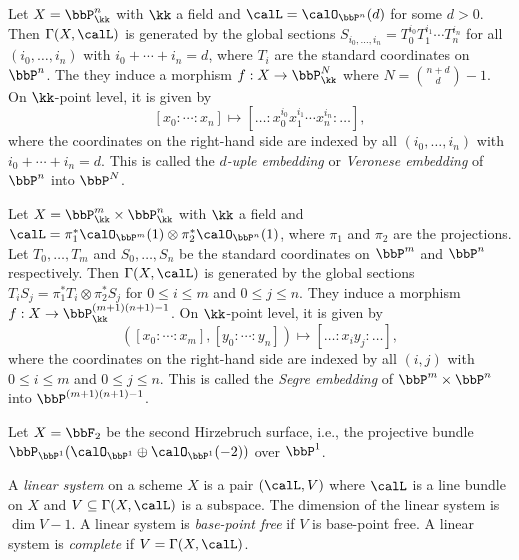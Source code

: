     \begin{example}\label{eg:d-uple_embedding_or_Veronese_embedding}
        Let \(X=\bbP^n_\kk\) with \(\kk\) a field and \(\calL=\calO_{\bbP^n}(d)\) for some \(d>0\).
        Then \(\Gamma(X,\calL)\) is generated by the global sections \(S_{i_0,\ldots,i_n}=T_0^{i_0}T_1^{i_1}\cdots T_n^{i_n}\) for all \((i_0,\ldots,i_n)\) with \(i_0+\cdots+i_n=d\), where \(T_i\) are the standard coordinates on \(\bbP^n\).
        The they induce a morphism \(f:X\to \bbP^N_\kk\) where \(N=\binom{n+d}{d}-1\).
        On \(\kk\)-point level, it is given by
        \[
            [x_0:\cdots:x_n] \mapsto [\ldots:x_0^{i_0}x_1^{i_1}\cdots x_n^{i_n}:\ldots],
        \]
        where the coordinates on the right-hand side are indexed by all \((i_0,\ldots,i_n)\) with \(i_0+\cdots+i_n=d\).
        This is called the \emph{\(d\)-uple embedding} or \emph{Veronese embedding} of \(\bbP^n\) into \(\bbP^N\).
    \end{example}

    \begin{example}\label{eg:Segre_embedding}
        Let \(X=\bbP^m_\kk \times \bbP^n_\kk\) with \(\kk\) a field and \(\calL=\pi_1^*\calO_{\bbP^m}(1) \otimes \pi_2^*\calO_{\bbP^n}(1)\), where \(\pi_1\) and \(\pi_2\) are the projections.
        Let \(T_0,\ldots,T_m\) and \(S_0,\ldots,S_n\) be the standard coordinates on \(\bbP^m\) and \(\bbP^n\) respectively.
        Then \(\Gamma(X,\calL)\) is generated by the global sections \(T_i S_j = \pi_1^*T_i \otimes \pi_2^*S_j\) for \(0\leq i \leq m\) and \(0\leq j \leq n\).
        They induce a morphism \(f:X\to \bbP^{(m+1)(n+1)-1}_\kk\).
        On \(\kk\)-point level, it is given by
        \[ ([x_0:\cdots:x_m],[y_0:\cdots:y_n]) \mapsto [\ldots:x_i y_j:\ldots], \]
        where the coordinates on the right-hand side are indexed by all \((i,j)\) with \(0\leq i \leq m\) and \(0\leq j \leq n\).
        This is called the \emph{Segre embedding} of \(\bbP^m \times \bbP^n\) into \(\bbP^{(m+1)(n+1)-1}\).
    \end{example}

    \begin{example}\label{eg:morphism_induced_by_-K_of_Hirzebruch_surface_F_2}
        Let \(X=\bbF_2\) be the second Hirzebruch surface, i.e., the projective bundle \(\bbP_{\bbP^1}(\calO_{\bbP^1}\oplus \calO_{\bbP^1}(-2))\) over \(\bbP^1\).
    \end{example}

    \begin{definition}\label{def:general_linear_system}
        A \emph{linear system} on a scheme \(X\) is a pair \((\calL,V)\) where \(\calL\) is a line bundle on \(X\) and \(V\subseteq \Gamma(X,\calL)\) is a subspace.
        The dimension of the linear system is \(\dim V - 1\).
        A linear system is \emph{base-point free} if \(V\) is base-point free.
        A linear system is \emph{complete} if \(V=\Gamma(X,\calL)\).
        
    \end{definition}



